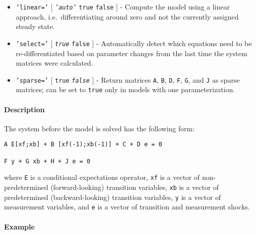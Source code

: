 \begin{itemize}
\item
  \texttt{'linear='} {[} \emph{\texttt{'auto'}} \textbar{} \texttt{true}
  \textbar{} \texttt{false} {]} - Compute the model using a linear
  approach, i.e.~differentiating around zero and not the currently
  assigned steady state.
\item
  \texttt{'select='} {[} \emph{\texttt{true}} \textbar{} \texttt{false}
  {]} - Automatically detect which equations need to be
  re-differentiated based on parameter changes from the last time the
  system matrices were calculated.
\item
  \texttt{'sparse='} {[} \texttt{true} \textbar{} \emph{\texttt{false}}
  {]} - Return matrices \texttt{A}, \texttt{B}, \texttt{D}, \texttt{F},
  \texttt{G}, and \texttt{J} as sparse matrices; can be set to
  \texttt{true} only in models with one parameterization.
\end{itemize}

\paragraph{Description}\label{description}

The system before the model is solved has the following form:

\begin{verbatim}
A E[xf;xb] + B [xf(-1);xb(-1)] + C + D e = 0

F y + G xb + H + J e = 0
\end{verbatim}

where \texttt{E} is a conditional expectations operator, \texttt{xf} is
a vector of non-predetermined (forward-looking) transition variables,
\texttt{xb} is a vector of predetermined (backward-looking) transition
variables, \texttt{y} is a vector of measurement variables, and
\texttt{e} is a vector of transition and measurement shocks.

\paragraph{Example}\label{example}


